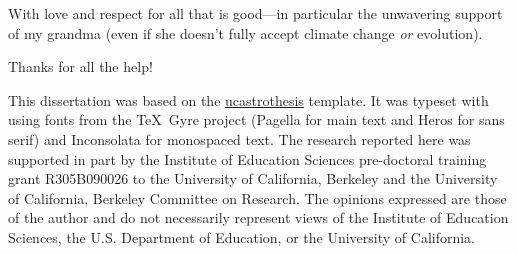 \documentclass[12pt]{myucthesis}
\begin{document}
\begin{frontmatter}

\begin{dedication}
\null\vfil
{\large
\begin{center}
With love and respect for all that is good---in particular the unwavering
support of my grandma (even if she doesn't fully accept climate change \emph{or}
evolution).
\end{center} }
\null\vfil
\end{dedication}

\tableofcontents
\listoffigures %
\listoftables %


\begin{acknowledgements}
Thanks for all the help!






This dissertation was based on the
\href{https://github.com/pkgw/ucastrothesis}{\textsf{ucastrothesis}} template.
It was typeset with  using fonts from the \TeX\ Gyre project
(Pagella for main text and Heros for sans serif) and Inconsolata for monospaced
text. The research reported here was supported in part by the Institute of
Education Sciences pre-doctoral training grant R305B090026 to the University of
California, Berkeley and the University of California, Berkeley Committee on
Research. The opinions expressed are those of the author and do not necessarily
represent views of the Institute of Education Sciences, the U.S.  Department of
Education, or the University of California.


\end{acknowledgements}
\end{frontmatter}
\end{document}
